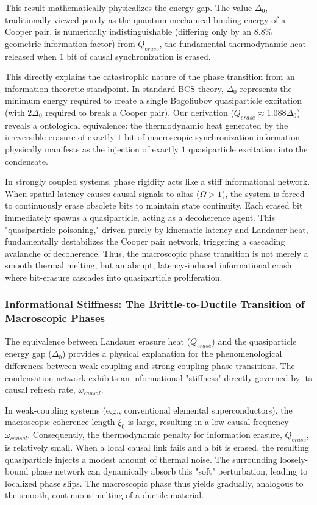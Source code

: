 \documentclass[11pt,a4paper]{article}
\begin{document}
This result mathematically physicalizes the energy gap. The value $\Delta_0$, traditionally viewed purely as the quantum mechanical binding energy of a Cooper pair, is numerically indistinguishable (differing only by an $8.8\%$ geometric-information factor) from $Q_{erase}$, the fundamental thermodynamic heat released when $1$ bit of causal synchronization is erased. 

This directly explains the catastrophic nature of the phase transition from an information-theoretic standpoint. In standard BCS theory, $\Delta_0$ represents the minimum energy required to create a single Bogoliubov quasiparticle excitation (with $2\Delta_0$ required to break a Cooper pair). Our derivation ($Q_{erase} \approx 1.088 \Delta_0$) reveals a ontological equivalence: the thermodynamic heat generated by the irreversible erasure of exactly $1$ bit of macroscopic synchronization information physically manifests as the injection of exactly $1$ quasiparticle excitation into the condensate.

In strongly coupled systems, phase rigidity acts like a stiff informational network. When spatial latency causes causal signals to alias ($\Omega > 1$), the system is forced to continuously erase obsolete bits to maintain state continuity. Each erased bit immediately spawns a quasiparticle, acting as a decoherence agent. This "quasiparticle poisoning," driven purely by kinematic latency and Landauer heat, fundamentally destabilizes the Cooper pair network, triggering a cascading avalanche of decoherence. Thus, the macroscopic phase transition is not merely a smooth thermal melting, but an abrupt, latency-induced informational crash where bit-erasure cascades into quasiparticle proliferation.

\subsubsection*{Informational Stiffness: The Brittle-to-Ductile Transition of Macroscopic Phases}

The equivalence between Landauer erasure heat ($Q_{erase}$) and the quasiparticle energy gap ($\Delta_0$) provides a physical explanation for the phenomenological differences between weak-coupling and strong-coupling phase transitions. The condensation network exhibits an informational "stiffness" directly governed by its causal refresh rate, $\omega_{causal}$.

In weak-coupling systems (e.g., conventional elemental superconductors), the macroscopic coherence length $\xi_0$ is large, resulting in a low causal frequency $\omega_{causal}$. Consequently, the thermodynamic penalty for information erasure, $Q_{erase}$, is relatively small. When a local causal link fails and a bit is erased, the resulting quasiparticle injects a modest amount of thermal noise. The surrounding loosely-bound phase network can dynamically absorb this "soft" perturbation, leading to localized phase slips. The macroscopic phase thus yields gradually, analogous to the smooth, continuous melting of a ductile material.
\end{document}
